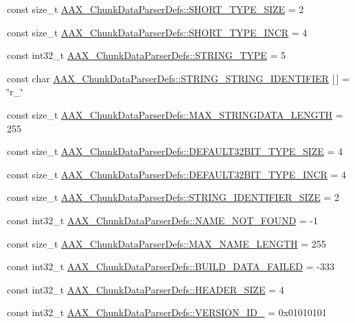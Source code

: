 \begin{DoxyCompactItemize}
\item 
const size\+\_\+t \hyperlink{a00321_a6807b39d59eed044eeefbd82c1fc9197}{A\+A\+X\+\_\+\+Chunk\+Data\+Parser\+Defs\+::\+S\+H\+O\+R\+T\+\_\+\+T\+Y\+P\+E\+\_\+\+S\+I\+Z\+E} = 2
\item 
const size\+\_\+t \hyperlink{a00321_a9aefe47f82372a9983eb5c00c14ac766}{A\+A\+X\+\_\+\+Chunk\+Data\+Parser\+Defs\+::\+S\+H\+O\+R\+T\+\_\+\+T\+Y\+P\+E\+\_\+\+I\+N\+C\+R} = 4
\item 
const int32\+\_\+t \hyperlink{a00321_aa7125477a4c5349f73b433334e9c4254}{A\+A\+X\+\_\+\+Chunk\+Data\+Parser\+Defs\+::\+S\+T\+R\+I\+N\+G\+\_\+\+T\+Y\+P\+E} = 5
\item 
const char \hyperlink{a00321_a3004646ddde8fc7d2ddf5402f50734f4}{A\+A\+X\+\_\+\+Chunk\+Data\+Parser\+Defs\+::\+S\+T\+R\+I\+N\+G\+\_\+\+S\+T\+R\+I\+N\+G\+\_\+\+I\+D\+E\+N\+T\+I\+F\+I\+E\+R} \mbox{[}$\,$\mbox{]} = \char`\"{}r\+\_\+\char`\"{}
\item 
const size\+\_\+t \hyperlink{a00321_a7c0e3fa427134810f5f7e12ae51c0e4e}{A\+A\+X\+\_\+\+Chunk\+Data\+Parser\+Defs\+::\+M\+A\+X\+\_\+\+S\+T\+R\+I\+N\+G\+D\+A\+T\+A\+\_\+\+L\+E\+N\+G\+T\+H} = 255
\item 
const size\+\_\+t \hyperlink{a00321_af40b7896c48bd8bb3ac060601e5e6945}{A\+A\+X\+\_\+\+Chunk\+Data\+Parser\+Defs\+::\+D\+E\+F\+A\+U\+L\+T32\+B\+I\+T\+\_\+\+T\+Y\+P\+E\+\_\+\+S\+I\+Z\+E} = 4
\item 
const size\+\_\+t \hyperlink{a00321_a6d7547242543558d67e96139a5627dd2}{A\+A\+X\+\_\+\+Chunk\+Data\+Parser\+Defs\+::\+D\+E\+F\+A\+U\+L\+T32\+B\+I\+T\+\_\+\+T\+Y\+P\+E\+\_\+\+I\+N\+C\+R} = 4
\item 
const size\+\_\+t \hyperlink{a00321_a11fc46547f00cbbe29b02b1ebd0f3dd0}{A\+A\+X\+\_\+\+Chunk\+Data\+Parser\+Defs\+::\+S\+T\+R\+I\+N\+G\+\_\+\+I\+D\+E\+N\+T\+I\+F\+I\+E\+R\+\_\+\+S\+I\+Z\+E} = 2
\item 
const int32\+\_\+t \hyperlink{a00321_a4af33563bfa9a20e489750090bb68329}{A\+A\+X\+\_\+\+Chunk\+Data\+Parser\+Defs\+::\+N\+A\+M\+E\+\_\+\+N\+O\+T\+\_\+\+F\+O\+U\+N\+D} = -\/1
\item 
const size\+\_\+t \hyperlink{a00321_a8cd7e74db8ce7ce5c4efdb9c5388742a}{A\+A\+X\+\_\+\+Chunk\+Data\+Parser\+Defs\+::\+M\+A\+X\+\_\+\+N\+A\+M\+E\+\_\+\+L\+E\+N\+G\+T\+H} = 255
\item 
const int32\+\_\+t \hyperlink{a00321_ab6190197be23431113a1f2b3f445ac9d}{A\+A\+X\+\_\+\+Chunk\+Data\+Parser\+Defs\+::\+B\+U\+I\+L\+D\+\_\+\+D\+A\+T\+A\+\_\+\+F\+A\+I\+L\+E\+D} = -\/333
\item 
const int32\+\_\+t \hyperlink{a00321_a4781240b7c5d7e82d07278fd9e6f7524}{A\+A\+X\+\_\+\+Chunk\+Data\+Parser\+Defs\+::\+H\+E\+A\+D\+E\+R\+\_\+\+S\+I\+Z\+E} = 4
\item 
const int32\+\_\+t \hyperlink{a00321_ae795429da33216b570397920343b8f05}{A\+A\+X\+\_\+\+Chunk\+Data\+Parser\+Defs\+::\+V\+E\+R\+S\+I\+O\+N\+\_\+\+I\+D\+\_} = 0x01010101
\end{DoxyCompactItemize}



